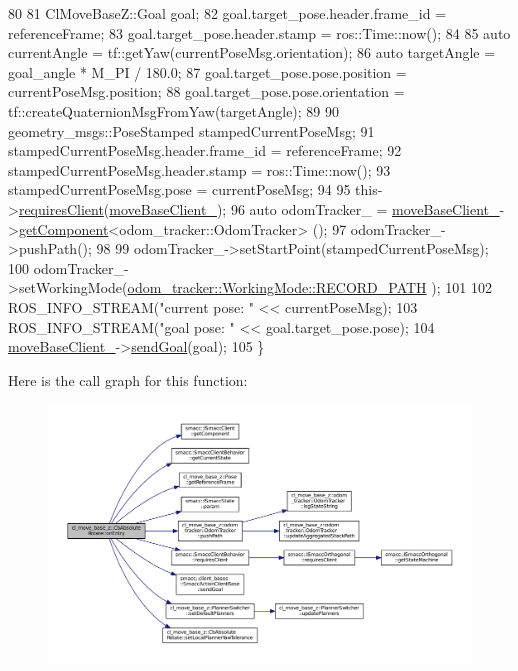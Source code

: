 \begin{DoxyCode}
80 
81     ClMoveBaseZ::Goal goal;
82     goal.target\_pose.header.frame\_id = referenceFrame;
83     goal.target\_pose.header.stamp = ros::Time::now();
84 
85     \textcolor{keyword}{auto} currentAngle = tf::getYaw(currentPoseMsg.orientation);
86     \textcolor{keyword}{auto} targetAngle = goal\_angle * M\_PI / 180.0;
87     goal.target\_pose.pose.position = currentPoseMsg.position;
88     goal.target\_pose.pose.orientation = tf::createQuaternionMsgFromYaw(targetAngle);
89 
90     geometry\_msgs::PoseStamped stampedCurrentPoseMsg;
91     stampedCurrentPoseMsg.header.frame\_id = referenceFrame;
92     stampedCurrentPoseMsg.header.stamp = ros::Time::now();
93     stampedCurrentPoseMsg.pose = currentPoseMsg;
94 
95     this->\hyperlink{classsmacc_1_1SmaccClientBehavior_a917f001e763a1059af337bf4e164f542}{requiresClient}(\hyperlink{classcl__move__base__z_1_1CbAbsoluteRotate_a8ddbef73316ff96f30493b28b5627e35}{moveBaseClient\_});
96     \textcolor{keyword}{auto} odomTracker\_ = \hyperlink{classcl__move__base__z_1_1CbAbsoluteRotate_a8ddbef73316ff96f30493b28b5627e35}{moveBaseClient\_}->\hyperlink{classsmacc_1_1ISmaccClient_adef78db601749ca63c19e74a27cb88cc}{getComponent}<odom\_tracker::OdomTracker>
      ();
97     odomTracker\_->pushPath();
98 
99     odomTracker\_->setStartPoint(stampedCurrentPoseMsg);
100     odomTracker\_->setWorkingMode(\hyperlink{namespacecl__move__base__z_1_1odom__tracker_ac46b05813b2791604f6cd0a39ace3ef8a023bc3adf68871ef7a0c616765ac80a7}{odom\_tracker::WorkingMode::RECORD\_PATH}
      );
101 
102     ROS\_INFO\_STREAM(\textcolor{stringliteral}{"current pose: "} << currentPoseMsg);
103     ROS\_INFO\_STREAM(\textcolor{stringliteral}{"goal pose: "} << goal.target\_pose.pose);
104     \hyperlink{classcl__move__base__z_1_1CbAbsoluteRotate_a8ddbef73316ff96f30493b28b5627e35}{moveBaseClient\_}->\hyperlink{classsmacc_1_1client__bases_1_1SmaccActionClientBase_a9c47a5094ac8afb01680307fe5eca922}{sendGoal}(goal);
105 \}
\end{DoxyCode}


Here is the call graph for this function\+:
\nopagebreak
\begin{figure}[H]
\begin{center}
\leavevmode
\includegraphics[width=350pt]{classcl__move__base__z_1_1CbAbsoluteRotate_a10418ea360809fa649d295716b152b2b_cgraph}
\end{center}
\end{figure}


